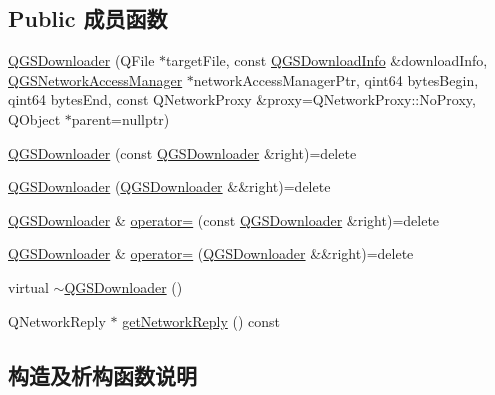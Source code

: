 \subsection*{Public 成员函数}
\begin{DoxyCompactItemize}
\item 
\mbox{\hyperlink{class_q_g_s_downloader_a4c056922b4a6b8beb49be2d6e9eef5e9}{Q\+G\+S\+Downloader}} (Q\+File $\ast$target\+File, const \mbox{\hyperlink{class_q_g_s_download_info}{Q\+G\+S\+Download\+Info}} \&download\+Info, \mbox{\hyperlink{class_q_g_s_network_access_manager}{Q\+G\+S\+Network\+Access\+Manager}} $\ast$network\+Access\+Manager\+Ptr, qint64 bytes\+Begin, qint64 bytes\+End, const Q\+Network\+Proxy \&proxy=Q\+Network\+Proxy\+::\+No\+Proxy, Q\+Object $\ast$parent=nullptr)
\item 
\mbox{\hyperlink{class_q_g_s_downloader_a85de50f01c9a7ac238f1799848caff3c}{Q\+G\+S\+Downloader}} (const \mbox{\hyperlink{class_q_g_s_downloader}{Q\+G\+S\+Downloader}} \&right)=delete
\item 
\mbox{\hyperlink{class_q_g_s_downloader_aa5d78f482e5a7fb04e18d447ba22c887}{Q\+G\+S\+Downloader}} (\mbox{\hyperlink{class_q_g_s_downloader}{Q\+G\+S\+Downloader}} \&\&right)=delete
\item 
\mbox{\hyperlink{class_q_g_s_downloader}{Q\+G\+S\+Downloader}} \& \mbox{\hyperlink{class_q_g_s_downloader_a1f3b205503643216d77ced3f40d2f657}{operator=}} (const \mbox{\hyperlink{class_q_g_s_downloader}{Q\+G\+S\+Downloader}} \&right)=delete
\item 
\mbox{\hyperlink{class_q_g_s_downloader}{Q\+G\+S\+Downloader}} \& \mbox{\hyperlink{class_q_g_s_downloader_aa1946444239f1f75edcc353aed70c92e}{operator=}} (\mbox{\hyperlink{class_q_g_s_downloader}{Q\+G\+S\+Downloader}} \&\&right)=delete
\item 
virtual \mbox{\hyperlink{class_q_g_s_downloader_a310f6a4151b5f2e26a1a3b8ec96ee2a6}{$\sim$\+Q\+G\+S\+Downloader}} ()
\item 
Q\+Network\+Reply $\ast$ \mbox{\hyperlink{class_q_g_s_downloader_a5aee4d36e29f76d8304e6fc79afea207}{get\+Network\+Reply}} () const
\end{DoxyCompactItemize}


\subsection{构造及析构函数说明}
\mbox{\label{class_q_g_s_downloader_a4c056922b4a6b8beb49be2d6e9eef5e9}} 
